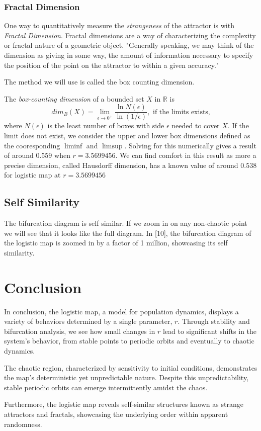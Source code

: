 \documentclass[11pt,twocolumn]{article}
\begin{document}
\cite{wikiAttractor}
\subsubsection{Fractal Dimension}
One way to quantitatively measure the \emph{strangeness} of the attractor is with \emph{Fractal Dimension}.
Fractal dimensions are a way of characterizing the complexity or fractal nature of a geometric object.
"Generally speaking, we may think of the dimension as giving in some way, the amount of information necessary to specify the position of the point on the attractor to within a given accuracy."
\cite{Sarmah2014}

The method we will use is called the box counting dimension.

The \emph{box-counting dimension} of a bounded set $X$ in $\mathbb{R}$ is
\[dim_B(X)=\lim_{\epsilon\to0^+}\frac{\ln N(\epsilon)}{\ln(1/\epsilon)}, \text{ if the limits exists,}\]
where $N(\epsilon)$ is the least number of boxes with side $\epsilon$ needed to cover $X$.
If the limit does not exist, we consider the upper and lower box dimensions defined as the cooresponding $\liminf$ and $\limsup$.
\cite{Falconer2013}
Solving for this numerically gives a result of around $0.559$ when $r=3.5699456$.
We can find comfort in this result as more a precise dimension, called Hausdorff dimension, has a known value of around $0.538$ for logistic map at $r=3.5699456$\cite{Grassberger1981}


\subsection{Self Similarity}
The bifurcation diagram is self similar. If we zoom in on any non-chaotic point we will see that it looks like the full diagram.
In [10]\cite{youtube}, the bifurcation diagram of the logistic map is zoomed in by a factor of 1 million, showcasing its self similarity.



\section{Conclusion}
In conclusion, the logistic map, a model for population dynamics, displays a variety of behaviors determined by a single parameter, $r$. Through stability and bifurcation analysis, we see how small changes in $r$ lead to significant shifts in the system's behavior, from stable points to periodic orbits and eventually to chaotic dynamics.

The chaotic region, characterized by sensitivity to initial conditions, demonstrates the map's deterministic yet unpredictable nature. Despite this unpredictability, stable periodic orbits can emerge intermittently amidst the chaos.

Furthermore, the logistic map reveals self-similar structures known as strange attractors and fractals, showcasing the underlying order within apparent randomness.







% 

\end{document}
